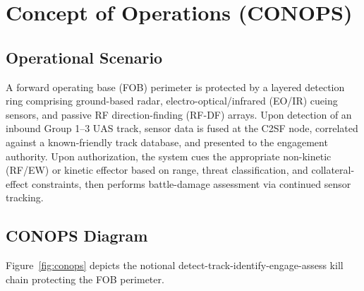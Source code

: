 \section{Concept of Operations (CONOPS)}

\subsection{Operational Scenario}
A forward operating base (FOB) perimeter is protected by a layered detection ring comprising ground-based radar, electro-optical/infrared (EO/IR) cueing sensors, and passive RF direction-finding (RF-DF) arrays. Upon detection of an inbound Group 1--3 UAS track, sensor data is fused at the C2SF node, correlated against a known-friendly track database, and presented to the engagement authority. Upon authorization, the system cues the appropriate non-kinetic (RF/EW) or kinetic effector based on range, threat classification, and collateral-effect constraints, then performs battle-damage assessment via continued sensor tracking.

\subsection{CONOPS Diagram}
Figure~\ref{fig:conops} depicts the notional detect-track-identify-engage-assess kill chain protecting the FOB perimeter.

